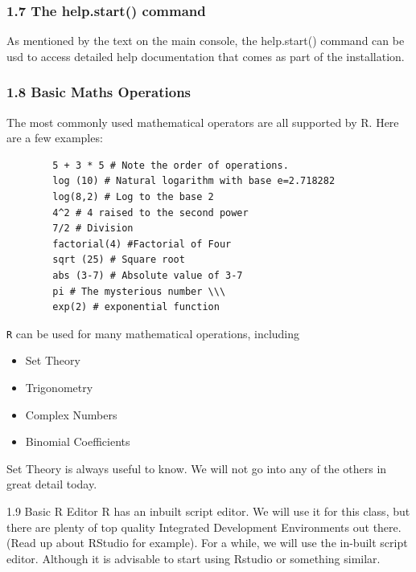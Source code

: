 \documentclass{beamer}
\begin{document}
	\begin{frame}
		
		
		\frametitle{1.7 The help.start() command}
		As mentioned by the text on the main console, the help.start() command can be usd to
		access detailed help documentation that comes as part of the installation.
	\end{frame}
	\begin{frame}[fragile]
		
		\frametitle{1.8 Basic Maths Operations}
		The most commonly used mathematical operators are all supported by R. Here are a few
		examples:
		
		\begin{verbatim}
		5 + 3 * 5 # Note the order of operations.
		log (10) # Natural logarithm with base e=2.718282
		log(8,2) # Log to the base 2
		4^2 # 4 raised to the second power
		7/2 # Division
		factorial(4) #Factorial of Four
		sqrt (25) # Square root
		abs (3-7) # Absolute value of 3-7
		pi # The mysterious number \\\
		exp(2) # exponential function
		\end{verbatim}
	\end{frame}
	\begin{frame}[fragile]
		
		\texttt{R} can be used for many mathematical operations, including
		
		\begin{itemize}
			\item Set Theory
			\item Trigonometry
			\item Complex Numbers
			\item Binomial Coefficients
		\end{itemize}
		Set Theory is always useful to know. We will not go into any of the others in great detail today.
	\end{frame}
	\begin{frame}
		
		1.9 Basic R Editor
		R has an inbuilt script editor. We will use it for this class, but there are plenty of top quality
		Integrated Development Environments out there. (Read up about RStudio for example).
		For a while, we will use the in-built script editor. Although it is advisable to start using Rstudio or something similar.
		
	\end{frame}
\end{document}
